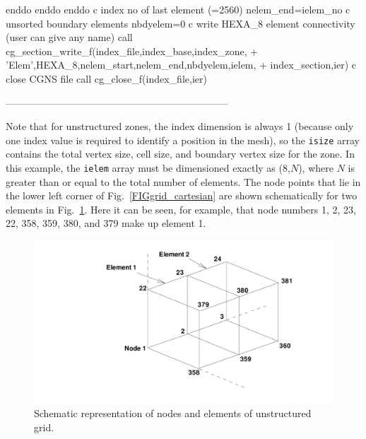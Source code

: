 \documentclass[12pt]{article}
\begin{document}
{\newline\indent\indent\indent   enddo
\newline\indent\indent   enddo
\newline\indent   enddo
\newline c  index no of last element (=2560)
\newline\indent      nelem\_end=ielem\_no
\newline c  unsorted boundary elements
\newline\indent      nbdyelem=0
\newline c  write HEXA\_8 element connectivity (user can give any name)
\newline\indent      call cg\_section\_write\_f(index\_file,index\_base,index\_zone,
\newline + \indent 'Elem',HEXA\_8,nelem\_start,nelem\_end,nbdyelem,ielem,
\newline + \indent index\_section,ier)
\newline c  close CGNS file
\newline\indent      call cg\_close\_f(index\_file,ier)}

--------------------------------------------------------------------

Note that for unstructured zones, the index dimension is always 1
(because only one index value is required to identify a position
in the mesh),
so the {\tt isize} array contains the total vertex size, cell size,
and boundary vertex size for the zone.
In this example, the {\tt ielem} array must be dimensioned exactly
as (8,$N$), where $N$ is greater than or equal to the total number
of elements.
The node points that lie in the lower left corner of 
Fig.~\ref{FIGgrid_cartesian} are shown schematically
for two elements in Fig.~\ref{FIGgrid_cartesianU}.
Here it can be seen, for example, that node numbers
1, 2, 23, 22, 358, 359, 380, and 379 make up element 1.

\begin{figure}[hpbt]
\centerline{{\includegraphics[width=150mm]{figures/grid_cartesianU}}}
\caption{Schematic representation of nodes and elements of unstructured grid.}
\label{FIGgrid_cartesianU}
\end{figure}
%
\end{document}
